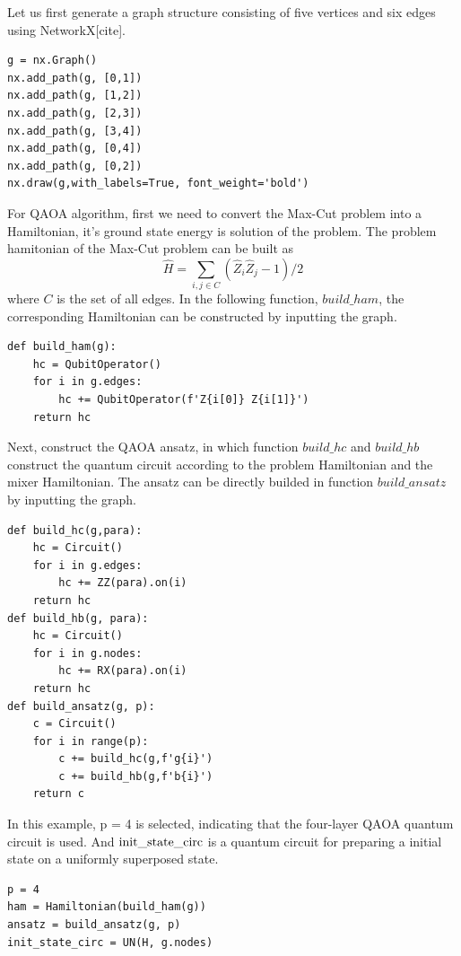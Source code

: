 Let us first generate a graph structure consisting of five vertices and six edges using NetworkX[cite].
\begin{lstlisting}
g = nx.Graph()
nx.add_path(g, [0,1])
nx.add_path(g, [1,2])
nx.add_path(g, [2,3])
nx.add_path(g, [3,4])
nx.add_path(g, [0,4])
nx.add_path(g, [0,2])
nx.draw(g,with_labels=True, font_weight='bold')
\end{lstlisting}

For QAOA algorithm, first we need to convert the Max-Cut problem into a Hamiltonian, it's ground state energy is solution of the problem. The problem hamitonian of the Max-Cut problem can be built as
\begin{equation}
    \hat{H} = \sum_{i,j\in C}(\hat{Z}_i\hat{Z}_j-1)/2
\end{equation}
where $C$ is the set of all edges. In the following function, ${ build \_ ham}$, the corresponding Hamiltonian can be constructed by inputting the graph.
\begin{lstlisting}
def build_ham(g):
    hc = QubitOperator()
    for i in g.edges:
        hc += QubitOperator(f'Z{i[0]} Z{i[1]}')
    return hc
\end{lstlisting}
Next, construct the QAOA ansatz, in which function $build\_hc$ and $build\_hb$ construct the quantum circuit according to the problem Hamiltonian and the mixer Hamiltonian. The ansatz can be directly builded in function $build\_ansatz$ by inputting the graph.

\begin{lstlisting}
def build_hc(g,para):
    hc = Circuit()
    for i in g.edges:
        hc += ZZ(para).on(i)
    return hc
def build_hb(g, para):
    hc = Circuit()
    for i in g.nodes:
        hc += RX(para).on(i)
    return hc
def build_ansatz(g, p):
    c = Circuit()
    for i in range(p):
        c += build_hc(g,f'g{i}')
        c += build_hb(g,f'b{i}')
    return c
\end{lstlisting}

In this example, p = 4 is selected, indicating that the four-layer QAOA quantum circuit is used.  And ${\rm init\_state\_circ}$ is a quantum circuit for preparing a initial state on a uniformly superposed state.
\begin{lstlisting}
p = 4
ham = Hamiltonian(build_ham(g))
ansatz = build_ansatz(g, p)
init_state_circ = UN(H, g.nodes)
\end{lstlisting}

